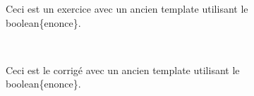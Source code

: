 {%
Ceci est un exercice avec un ancien template \latex utilisant le \\boolean\{enonce\}.

~\\
}
{%
 Ceci est le corrigé avec un ancien template \latex utilisant le \\boolean\{enonce\}.

~\\
}

